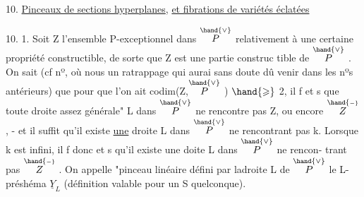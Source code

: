 
10. \uline{Pinceaux de sections hyperplanes}, \uline{et fibrations de variétés éclatées}

10. 1. Soit Z l'ensemble P-exceptionnel dans $\overset{\hand{\vee}}{P}$ relativement à une
certaine propriété constructible, de sorte que Z est une partie construc%
tible de $\overset{\hand{\vee}}{P}$ .  On sait (cf nº, où nous  un ratrappage
 qui aurai sans doute dû venir dans les nºs antérieurs) que pour que
l'on ait codim(Z,$\overset{\hand{\vee}}{P}$ ) $\hand{\geqslant}$ 2, il f et s que toute droite assez
générale" L dans $\overset{\hand{\vee}}{P}$ ne rencontre pas Z,  ou encore $\overset{\hand{\scriptscriptstyle -}}{Z}$ , - et il suffit
qu'il existe \uline{une} droite L dans $\overset{\hand{\vee}}{P}$ ne rencontrant pas k. Lorsque 
k est infini, il f donc et s qu'il existe une doite L dans $\overset{\hand{\vee}}{P}$ ne rencon-%
trant pas $\overset{\hand{\scriptscriptstyle -}}{Z}$ . On appelle "pinceau linéaire défini par ladroite
L de $\overset{\hand{\vee}}{P}$\hand{,} le L-préshéma $\underline{Y}_L$ (définition valable pour un S quelconque).
